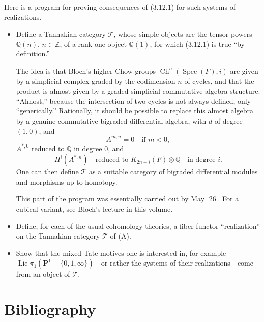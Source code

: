 \documentclass[11pt,a4paper]{article}
\theoremstyle{plain}
\theoremstyle{definition}
\DeclareMathOperator{\Spec}{Spec}
\DeclareMathOperator{\Ch}{Ch}
\DeclareMathOperator{\Lie}{Lie}
\newcommand{\Q}{\mathbb{Q}}
\newcommand{\Z}{\mathbb{Z}}
\begin{document}
Here is a program for proving consequences of (3.12.1) for such systems of realizations.

\begin{itemize}
\item[(A)] Define a Tannakian category $\mathcal{T}$, whose simple objects are the tensor powers $\Q(n)$, $n\in\Z$, of a rank-one object $\Q(1)$, for which (3.12.1) is true ``by definition.''

The idea is that Bloch's higher Chow groups $\Ch^n(\Spec(F),i)$ are given by a simplicial complex graded by the codimension $n$ of cycles, and that the product is almost given by a graded simplicial commutative algebra structure. ``Almost,'' because the intersection of two cycles is not always defined, only ``generically.'' Rationally, it should be possible to replace this almost algebra by a genuine commutative bigraded differential algebra, with $d$ of degree $(1,0)$, and
$$
A^{m,n}=0\quad\text{if }m<0,
$$
$A^{*,0}$ reduced to $\Q$ in degree $0$, and
$$
H^i(A^{*,n})\quad\text{reduced to }K_{2n-i}(F)\otimes\Q\quad\text{in degree }i.
$$
One can then define $\mathcal{T}$ as a suitable category of bigraded differential modules and morphisms up to homotopy.

This part of the program was essentially carried out by May [26]. For a cubical variant, see Bloch's lecture in this volume.

\item[(B)] Define, for each of the usual cohomology theories, a fiber functor ``realization'' on the Tannakian category $\mathcal{T}$ of (A).

\item[(C)] Show that the mixed Tate motives one is interested in, for example $\Lie\pi_1(\mathbf{P}^1-\{0,1,\infty\})$---or rather the systems of their realizations---come from an object of $\mathcal{T}$.
\end{itemize}

\section*{Bibliography}
\end{document}

